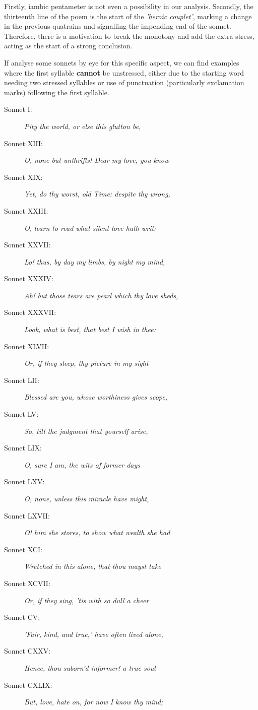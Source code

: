 \begin{description}
Firstly, iambic pentameter is not even a possibility in our analysis. Secondly, the thirteenth line of the poem is the start of the \textit{'heroic couplet'}, marking a change in the previous quatrains and signalling the impending end of the sonnet. Therefore, there is a motivation to break the monotony and add the extra stress, acting as the start of a strong conclusion.

If analyse some sonnets by eye for this specific aspect, we can find examples where the first syllable \textbf{cannot} be unstressed, either due to the starting word needing two stressed syllables or use of punctuation (particularly exclamation marks) following the first syllable.

\begin{description}
\item[Sonnet I: ] \textit{Pity the world, or else this glutton be,}
\item[Sonnet XIII: ] \textit{O, none but unthrifts! Dear my love, you know}
\item[Sonnet XIX: ] \textit{Yet, do thy worst, old Time: despite thy wrong,}
\item[Sonnet XXIII: ] \textit{O, learn to read what silent love hath writ:}
\item[Sonnet XXVII: ] \textit{Lo! thus, by day my limbs, by night my mind,}
\item[Sonnet XXXIV: ] \textit{Ah! but those tears are pearl which thy love sheds,}
\item[Sonnet XXXVII: ] \textit{Look, what is best, that best I wish in thee:}
\item[Sonnet XLVII: ] \textit{Or, if they sleep, thy picture in my sight}
\item[Sonnet LII: ] \textit{Blessed are you, whose worthiness gives scope,}
\item[Sonnet LV: ] \textit{So, till the judgment that yourself arise,}
\item[Sonnet LIX: ] \textit{O, sure I am, the wits of former days}
\item[Sonnet LXV: ] \textit{O, none, unless this miracle have might,}
\item[Sonnet LXVII: ] \textit{O! him she stores, to show what wealth she had}
\item[Sonnet XCI: ] \textit{Wretched in this alone, that thou mayst take}
\item[Sonnet XCVII: ] \textit{Or, if they sing, 'tis with so dull a cheer}
\item[Sonnet CV: ] \textit{'Fair, kind, and true,' have often lived alone,}
\item[Sonnet CXXV: ] \textit{Hence, thou suborn'd informer! a true soul}
\item[Sonnet CXLIX: ] \textit{But, love, hate on, for now I know thy mind;}
\end{description}


\end{description}
